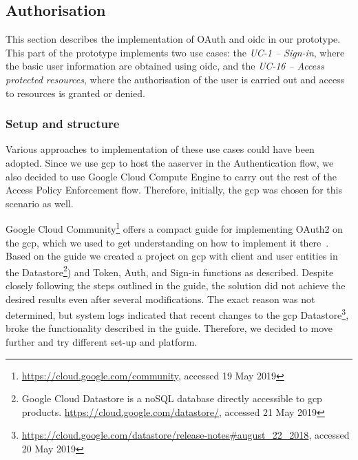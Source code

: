 \subsection{Authorisation} \label{sec:implementation-oauth}
This section describes the implementation of OAuth and \acrshort{oidc} in our prototype. This part of the prototype implements two use cases: the \textit{UC-1 -- Sign-in}, where the basic user information are obtained using \acrshort{oidc}, and the \textit{UC-16 -- Access protected resources}, where the authorisation of the user is carried out and access to resources is granted or denied.

\subsubsection{Setup and structure}
Various approaches to implementation of these use cases could have been adopted. Since we use \acrfull{gcp} to host the \acrshort{aaserver} in the Authentication flow, we also decided to use Google Cloud Compute Engine to carry out the rest of the Access Policy Enforcement flow. Therefore, initially, the \acrlong{gcp} was chosen for this scenario as well.

Google Cloud Community\footnote{\url{https://cloud.google.com/community}, accessed 19 May 2019} offers a compact guide for implementing OAuth2 on the \acrshort{gcp}, which we used to get understanding on how to implement it there~\cite{Awyu2018UnderstandingCloud}. Based on the guide we created a project on \acrshort{gcp} with client and user entities in the Datastore\footnote{Google Cloud Datastore is a noSQL database directly accessible to \acrshort{gcp} products. \url{https://cloud.google.com/datastore/}, accessed 21 May 2019}) and Token, Auth, and Sign-in functions as described. Despite closely following the steps outlined in the guide, the solution did not achieve the desired results even after several modifications. The exact reason was not determined, but system logs indicated that recent changes to the \acrshort{gcp} Datastore\footnote{\url{https://cloud.google.com/datastore/release-notes\#august_22_2018}, accessed 20 May 2019}, broke the functionality described in the guide. Therefore, we decided to move further and try different set-up and platform.

